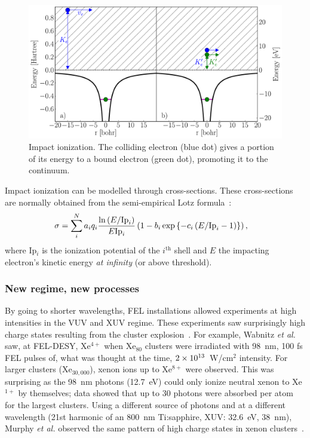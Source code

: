 \begin{figure}
 \centering
 \includegraphics[width=\figurewidth]{figures/ionization_impact}
 \caption{Impact ionization. The colliding electron (blue dot) gives a portion
          of its energy to a bound electron (green dot), promoting it to the
          continuum.}
 \label{fig:ionization:impact}
\end{figure}

Impact ionization can be modelled through cross-sections. These
cross-sections are normally obtained from the semi-empirical Lotz
formula~\cite{Lotz1967}:
\begin{align}
\sigma & = \sum_{i}^{N} a_i q_i \frac{\ln{\left( E/\textrm{Ip}_i \right)}}{E \textrm{Ip}_i} \left( 1 - b_i
\exp{ \left\{ -c_i \left( E/\textrm{Ip}_i - 1 \right) \right\}} \right),
\label{eqn:impact:ionization:lotz}
\end{align}
where Ip$_i$ is the ionization potential of the $i^{\textrm{th}}$ shell and $E$
the impacting electron's kinetic energy \textit{at infinity} (or above threshold).

\subsubsection{New regime, new processes}
\label{section:intro:mechanisms:new}

By going to shorter wavelengths, FEL installations allowed experiments at high
intensities in the VUV and XUV regime. These experiments saw surprisingly
high charge states resulting from the cluster
explosion~\cite{Wabnitz2002,Bostedt2010}. For example, Wabnitz \textit{et al.}
saw, at FEL-DESY, Xe$^{4+}$ when Xe$_{80}$ clusters were irradiated with 98~nm,
100 fs FEL pulses of, what was thought at the time, $\ten{2}{13}$~W/cm$^2$
intensity. For larger clusters (Xe$_{30,000}$), xenon ions up to
Xe$^{8+}$ were observed. This was surprising as the 98~nm
photons (12.7~eV) could only ionize neutral xenon to Xe$^{1+}$ by themselves;
data showed that up to 30 photons were absorbed per atom for the largest
clusters. Using a different source of photons and at a different wavelength
(21st harmonic of an 800~nm Ti:sapphire, XUV: 32.6~eV, 38~nm),
Murphy \textit{et al.} observed the same pattern of high charge states in xenon
clusters~\cite{Murphy2008a,Murphy2008b}.

